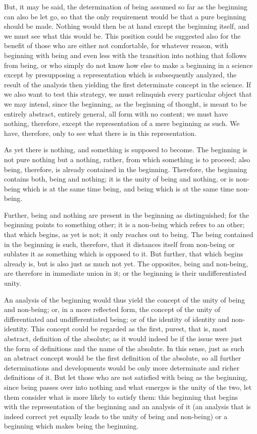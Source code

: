 But, it may be said, the determination of being
assumed so far as the beginning can also be let go,
so that the only requirement would be
that a pure beginning should be made.
Nothing would then be at hand
except the beginning itself,
and we must see what this would be.
This position could be suggested also for the benefit
of those who are either not comfortable,
for whatever reason, with beginning with being
and even less with the transition into nothing
that follows from being,
or who simply do not know how else to make a beginning
in a science except by presupposing a representation
which is subsequently analyzed,
the result of the analysis then yielding
the first determinate concept in the science.
If we also want to test this strategy,
we must relinquish every particular object
that we may intend, since the beginning,
as the beginning of thought,
is meant to be entirely abstract,
entirely general, all form with no content;
we must have nothing, therefore,
except the representation of a mere beginning as such.
We have, therefore, only to see
what there is in this representation.

As yet there is nothing, and something is supposed to become.
The beginning is not pure nothing but a nothing, rather,
from which something is to proceed;
also being, therefore, is already contained in the beginning.
Therefore, the beginning contains both, being and nothing;
it is the unity of being and nothing,
or is non-being which is at the same time being,
and being which is at the same time non-being.

Further, being and nothing are present
in the beginning as distinguished;
for the beginning points to something other;
it is a non-being which refers to an other;
that which begins, as yet is not;
it only reaches out to being.
The being contained in the beginning is such, therefore,
that it distances itself from non-being
or sublates it as something which is opposed to it.
But further, that which begins already is,
but is also just as much not yet.
The opposites, being and non-being, are
therefore in immediate union in it;
or the beginning is their undifferentiated unity.

An analysis of the beginning would thus yield
the concept of the unity of being and non-being;
or, in a more reflected form, the concept of the unity
of differentiated and undifferentiated being;
or of the identity of identity and non-identity.
This concept could be regarded as the first,
purest, that is, most abstract, definition of the absolute;
as it would indeed be if the issue were just
the form of definitions and the name of the absolute.
In this sense, just as such an abstract concept
would be the first definition of the absolute,
so all further determinations and developments would be only
more determinate and richer definitions of it.
But let those who are not satisfied with being as the beginning,
since being passes over into nothing
and what emerges is the unity of the two,
let them consider what is more likely to satisfy them:
this beginning that begins with the representation
of the beginning and an analysis of it
(an analysis that is indeed correct yet
equally leads to the unity of being and non-being)
or a beginning which makes being the beginning.

